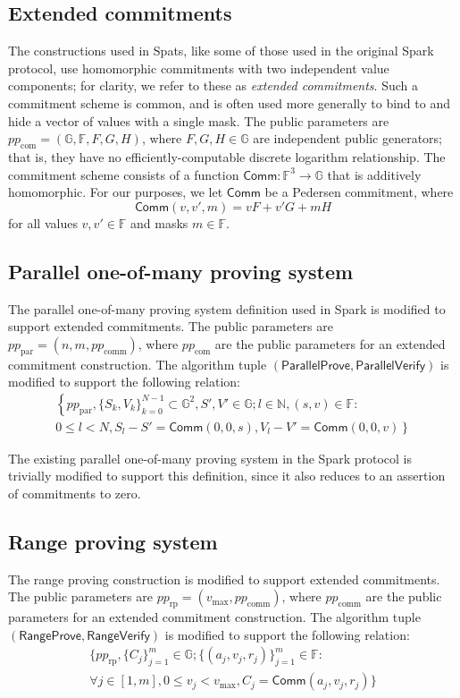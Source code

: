 \documentclass{article}
\newcommand{\G}{\mathbb{G}}
\newcommand{\F}{\mathbb{F}}
\newcommand{\func}[1]{\mathsf{#1}}
\newcommand{\comm}{\func{Comm}}
\begin{document}
\subsection{Extended commitments}

The constructions used in Spats, like some of those used in the original Spark protocol, use homomorphic commitments with two independent value components; for clarity, we refer to these as \textit{extended commitments}.
Such a commitment scheme is common, and is often used more generally to bind to and hide a vector of values with a single mask.
The public parameters are $pp_{\text{com}} = (\G, \F, F, G, H)$, where $F, G, H \in \G$ are independent public generators; that is, they have no efficiently-computable discrete logarithm relationship.
The commitment scheme consists of a function $\func{Comm}: \F^3 \to \G$ that is additively homomorphic.
For our purposes, we let $\func{Comm}$ be a Pedersen commitment, where $$\func{Comm}(v, v', m) = vF + v'G + mH$$ for all values $v, v' \in \F$ and masks $m \in \F$.


\subsection{Parallel one-of-many proving system}

The parallel one-of-many proving system definition used in Spark is modified to support extended commitments.
The public parameters are $pp_{\text{par}} = (n, m, pp_{\text{comm}})$, where $pp_{\text{com}}$ are the public parameters for an extended commitment construction.
The algorithm tuple $(\func{ParallelProve}, \func{ParallelVerify})$ is modified to support the following relation:
\begin{multline*}
\left\{ pp_{\text{par}}, \{S_k,V_k\}_{k=0}^{N-1} \subset \G^2, S',V' \in \G ; l \in \mathbb{N}, (s,v) \in \F : \right. \\
\left. 0 \leq l < N, S_l - S' = \comm(0,0,s), V_l - V' = \comm(0,0,v) \right\}
\end{multline*}

The existing parallel one-of-many proving system in the Spark protocol is trivially modified to support this definition, since it also reduces to an assertion of commitments to zero.


\subsection{Range proving system}

The range proving construction is modified to support extended commitments.
The public parameters are $pp_{\text{rp}} = (v_{\text{max}}, pp_{\text{comm}})$, where $pp_{\text{comm}}$ are the public parameters for an extended commitment construction.
The algorithm tuple $(\func{RangeProve}, \func{RangeVerify})$ is modified to support the following relation:
\begin{multline*}
\{ pp_{\text{rp}}, \{C_j\}_{j=1}^m \in \G ; \{(a_j, v_j, r_j)\}_{j=1}^m \in \F : \\
\forall j \in [1,m], 0 \leq v_j < v_{\text{max}}, C_j = \comm(a_j, v_j, r_j) \}
\end{multline*}
\end{document}
